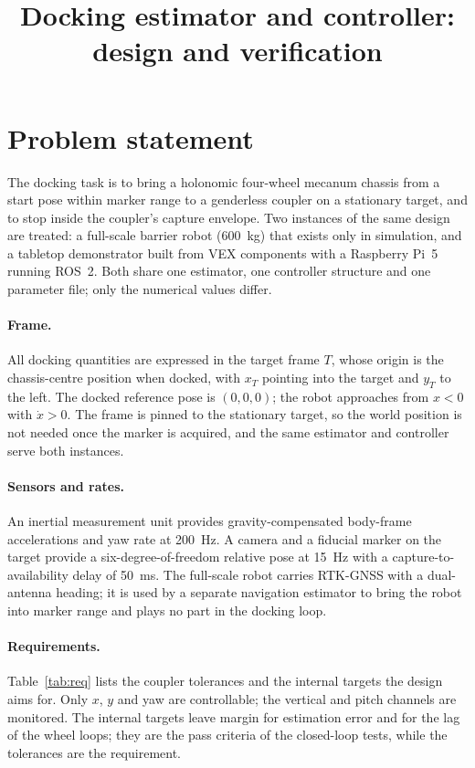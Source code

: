 \documentclass[11pt,a4paper]{article}
\title{Docking estimator and controller: design and verification}
\author{}
\date{}
\begin{document}
\maketitle
\vspace{-2em}

\section{Problem statement}
\label{sec:problem}

The docking task is to bring a holonomic four-wheel mecanum chassis from a start pose within marker range to a genderless coupler on a stationary target, and to stop inside the coupler's capture envelope. Two instances of the same design are treated: a full-scale barrier robot (600~kg) that exists only in simulation, and a tabletop demonstrator built from VEX components with a Raspberry Pi~5 running ROS~2. Both share one estimator, one controller structure and one parameter file; only the numerical values differ.

\paragraph{Frame.} All docking quantities are expressed in the target frame $T$, whose origin is the chassis-centre position when docked, with $x_T$ pointing into the target and $y_T$ to the left. The docked reference pose is $(0,0,0)$; the robot approaches from $x<0$ with $\dot x>0$. The frame is pinned to the stationary target, so the world position is not needed once the marker is acquired, and the same estimator and controller serve both instances.

\paragraph{Sensors and rates.} An inertial measurement unit provides gravity-compensated body-frame accelerations and yaw rate at 200~Hz. A camera and a fiducial marker on the target provide a six-degree-of-freedom relative pose at 15~Hz with a capture-to-availability delay of 50~ms. The full-scale robot carries RTK-GNSS with a dual-antenna heading; it is used by a separate navigation estimator to bring the robot into marker range and plays no part in the docking loop.

\paragraph{Requirements.} Table~\ref{tab:req} lists the coupler tolerances and the internal targets the design aims for. Only $x$, $y$ and yaw are controllable; the vertical and pitch channels are monitored. The internal targets leave margin for estimation error and for the lag of the wheel loops; they are the pass criteria of the closed-loop tests, while the tolerances are the requirement.
\end{document}
